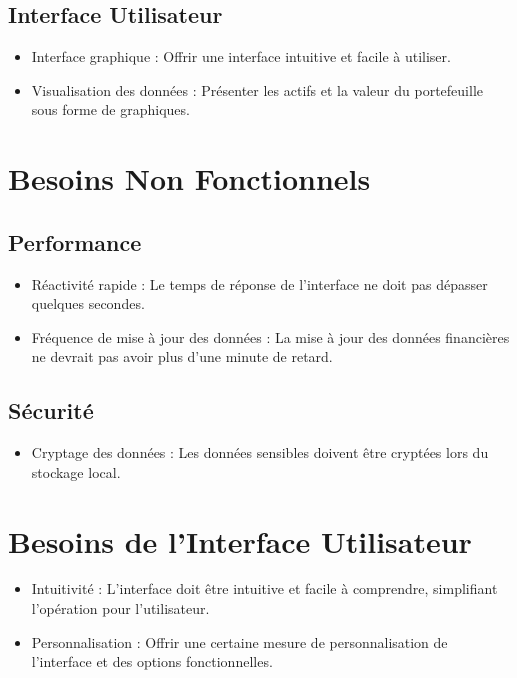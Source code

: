 \documentclass{article}
\begin{document}
\subsection{Interface Utilisateur}
\begin{itemize}
    \item Interface graphique : Offrir une interface intuitive et facile à utiliser.
    \item Visualisation des données : Présenter les actifs et la valeur du portefeuille sous forme de graphiques.
\end{itemize}

\section{Besoins Non Fonctionnels}
\subsection{Performance}
\begin{itemize}
    \item Réactivité rapide : Le temps de réponse de l'interface ne doit pas dépasser quelques secondes.
    \item Fréquence de mise à jour des données : La mise à jour des données financières ne devrait pas avoir plus d'une minute de retard.
\end{itemize}

\subsection{Sécurité}
\begin{itemize}
    \item Cryptage des données : Les données sensibles doivent être cryptées lors du stockage local.
\end{itemize}

\section{Besoins de l'Interface Utilisateur}
\begin{itemize}
    \item Intuitivité : L'interface doit être intuitive et facile à comprendre, simplifiant l'opération pour l'utilisateur.
    \item Personnalisation : Offrir une certaine mesure de personnalisation de l'interface et des options fonctionnelles.
\end{itemize}
\end{document}
